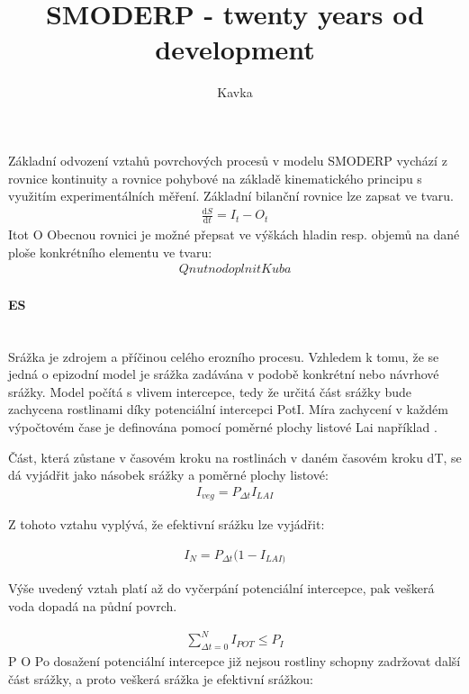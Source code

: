 \documentclass[a4paper, 12pt, twoside]{article}
\begin{document}
\title{SMODERP - twenty years od development}
\author{Kavka}
Základní odvození vztahů povrchových procesů v modelu SMODERP vychází z rovnice kontinuity a rovnice pohybové na základě kinematického principu s využitím experimentálních měření. Základní bilanční rovnice lze zapsat ve tvaru.
\begin{eqnarray}
\frac{\mathrm{d}S}{\mathrm{d}t} = I_{t} - O_{t}
\end{eqnarray}
\ac{Itot}
\ac{O}
Obecnou rovnici je možné přepsat ve výškách hladin resp. objemů na dané ploše konkrétního elementu ve tvaru:
\begin{eqnarray} \label{bilancnirce}
Q nutno doplnit Kuba
\end{eqnarray}


\paragraph{\acs{ES}}  \mbox{} \\

Srážka je zdrojem a příčinou celého erozního procesu. Vzhledem k tomu, že se jedná o epizodní model je srážka zadávána v podobě konkrétní nebo návrhové srážky. Model počítá s vlivem intercepce, tedy že určitá část srážky bude zachycena rostlinami díky potenciální intercepci \acl{PotI}. Míra zachycení v každém výpočtovém čase je definována  pomocí poměrné plochy listové \acl{Lai} například \cite{Nevim}.

Část, která zůstane v časovém kroku na rostlinách v daném časovém kroku \acl{dT}, se dá vyjádřit jako násobek srážky a poměrné plochy listové:
\begin{eqnarray} \label{intercepce}
I_{veg} = P_{\Delta t}I_{LAI}
\end{eqnarray}

Z tohoto vztahu vyplývá, že efektivní srážku lze vyjádřit:

\begin{eqnarray} \label{intercepce}
I_{N} = P_{\Delta t}(1 - I_{LAI)}
\end{eqnarray}

Výše uvedený vztah platí až do vyčerpání potenciální intercepce, pak veškerá voda dopadá na půdní povrch.

\begin{eqnarray}
\sum_{\Delta t=0}^N I_{POT} \leq P_{I}
\end{eqnarray}
\ac{P}
\ac{O}
Po dosažení potenciální intercepce již nejsou rostliny schopny zadržovat další část srážky, a proto veškerá srážka je efektivní srážkou:
\end{document}
